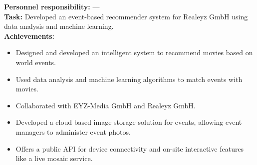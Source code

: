 \documentclass[10pt,a4paper,normalphoto]{altacv}
\begin{document}
\begin{fullwidth}
\vspace{1em}


\vspace{2em}

\textbf{Personnel responsibility:} —\\
\textbf{Task:} Developed an event-based recommender system for Realeyz GmbH using data analysis and machine learning.\\
\textbf{Achievements:}
\begin{itemize}
    \item Designed and developed an intelligent system to recommend movies based on world events.
    \item Used data analysis and machine learning algorithms to match events with movies.
    \item Collaborated with EYZ-Media GmbH and Realeyz GmbH.
\end{itemize}

\vspace{1em}


\vspace{2em}


\begin{itemize}
    \item Developed a cloud-based image storage solution for events, allowing event managers to administer event photos.
    \item Offers a public API for device connectivity and on-site interactive features like a live mosaic service.
\end{itemize}

\vspace{1em}



\end{fullwidth}
\end{document}
